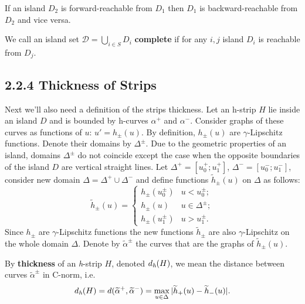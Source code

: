 \begin{remark}
	If an island $D_2$ is forward-reachable from $D_1$ then $D_1$ is backward-reachable from $D_2$ and vice versa.
\end{remark}

\begin{definition}
	We call an island set $\mathcal{D} = \bigcup_{i \in S} D_i$ {\bf complete} if for any $i, j$ island $D_i$ is reachable from $D_j$.
\label{def:complete-island-set}
\end{definition}

\subsection*{2.2.4 Thickness of Strips}

Next we'll also need a definition of the strips thickness.
Let an h-strip $H$ lie inside an island $D$ and is bounded by h-curves $\alpha^+$ and $\alpha^-$.
Consider graphs of these curves as functions of $u$: $u' = h_{\pm}(u)$.
By definition, $h_{\pm}(u)$ are $\gamma$-Lipschitz functions.
Denote their domains by $\Delta^{\pm}$.
Due to the geometric properties of an island, domains $\Delta^{\pm}$ do not coincide except the case when the opposite boundaries of the island $D$ are vertical straight lines.
Let $\Delta^+ = [u_0^+; u_1^+]$, $\Delta^- = [u_0^-; u_1^-]$, consider new domain $\Delta = \Delta^+ \cup \Delta^-$ and define functions $\widetilde{h}_{\pm}(u)$ on $\Delta$ as follows:
\begin{equation}
	\widetilde{h}_{\pm}(u) = \begin{cases}
		h_{\pm}(u_0^{\pm}) & u < u_0^{\pm}; \\
		h_{\pm}(u) & u \in \Delta^{\pm}; \\
		h_{\pm}(u_1^{\pm}) & u > u_1^{\pm}.
	\end{cases}
\label{eq:continuation}
\end{equation}
Since $h_{\pm}$ are $\gamma$-Lipschitz functions the new functions $\widetilde{h}_{\pm}$ are also $\gamma$-Lipschitz on the whole domain $\Delta$.
Denote by $\widetilde{\alpha}^{\pm}$ the curves that are the graphs of $\widetilde{h}_{\pm}(u)$.

\begin{definition}
\label{def:h-thickness}
	By {\bf thickness} of an \emph{h}-strip $H$, denoted $d_\emph{h}(H)$, we mean the distance between curves $\widetilde{\alpha}^{\pm}$ in C-norm, i.e.
	\begin{equation}
		d_\emph{h}(H) = d(\widetilde{\alpha}^+, \widetilde{\alpha}^-) = \max \limits_{u \in \Delta} |\widetilde{h}_+(u) - \widetilde{h}_-(u)|.
	\label{eq:h-thickness}
	\end{equation}
\end{definition}

